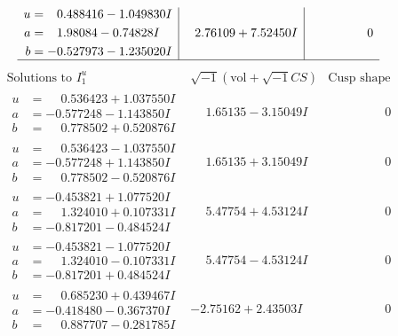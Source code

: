 \documentclass[1p]{elsarticle_modified}
\theoremstyle{definition}
\newcommand{\I}{\sqrt{-1}}
\begin{document}
$$\begin{array}{c|c|c}
\begin{aligned}
u &= \phantom{-}0.488416 - 1.049830 I \\
a &= \phantom{-}1.98084 - 0.74828 I \\
b &= -0.527973 - 1.235020 I\end{aligned}
 & \phantom{-}2.76109 + 7.52450 I & \phantom{-0.000000 } 0\\
 \hline 
 \end{array}$$\newpage$$\begin{array}{c|c|c}  
\text{Solutions to }I^u_{1}& \I (\text{vol} + \sqrt{-1}CS) & \text{Cusp shape}\\
 \hline 
\begin{aligned}
u &= \phantom{-}0.536423 + 1.037550 I \\
a &= -0.577248 - 1.143850 I \\
b &= \phantom{-}0.778502 + 0.520876 I\end{aligned}
 & \phantom{-}1.65135 - 3.15049 I & \phantom{-0.000000 } 0 \\ \hline\begin{aligned}
u &= \phantom{-}0.536423 - 1.037550 I \\
a &= -0.577248 + 1.143850 I \\
b &= \phantom{-}0.778502 - 0.520876 I\end{aligned}
 & \phantom{-}1.65135 + 3.15049 I & \phantom{-0.000000 } 0 \\ \hline\begin{aligned}
u &= -0.453821 + 1.077520 I \\
a &= \phantom{-}1.324010 + 0.107331 I \\
b &= -0.817201 - 0.484524 I\end{aligned}
 & \phantom{-}5.47754 + 4.53124 I & \phantom{-0.000000 } 0 \\ \hline\begin{aligned}
u &= -0.453821 - 1.077520 I \\
a &= \phantom{-}1.324010 - 0.107331 I \\
b &= -0.817201 + 0.484524 I\end{aligned}
 & \phantom{-}5.47754 - 4.53124 I & \phantom{-0.000000 } 0 \\ \hline\begin{aligned}
u &= \phantom{-}0.685230 + 0.439467 I \\
a &= -0.418480 - 0.367370 I \\
b &= \phantom{-}0.887707 - 0.281785 I\end{aligned}
 & -2.75162 + 2.43503 I & \phantom{-0.000000 } 0 \\ \hline\begin{aligned}

\end{aligned}
\end{array}$$
\end{document}
